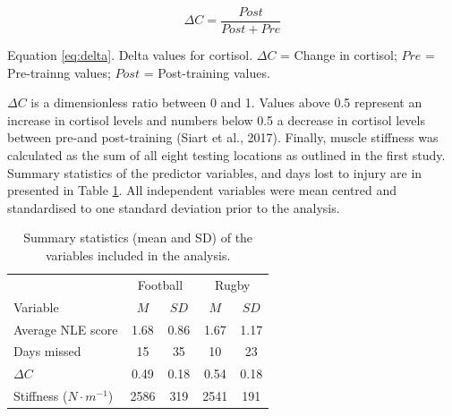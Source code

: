 \documentclass[man,floatsintext]{apa6}
\begin{document}
\begin{equation} 
  \Delta C = \frac{Post}{Post + Pre}
  \label{eq:delta}
\end{equation}

\noindent Equation \eqref{eq:delta}. Delta values for cortisol. \(\Delta C\) = Change in cortisol; \(Pre\) = Pre-trainng values; \(Post\) = Post-training values.

\(\Delta C\) is a dimensionless ratio between 0 and 1. Values above 0.5 represent an increase in cortisol levels and numbers below 0.5 a decrease in cortisol levels between pre-and post-training (Siart et al., 2017).
Finally, muscle stiffness was calculated as the sum of all eight testing locations as outlined in the first study.
Summary statistics of the predictor variables, and days lost to injury are in presented in Table \ref{tab:descriptivevars}.
All independent variables were mean centred and standardised to one standard deviation prior to the analysis.

\begin{table}[H]

\begin{center}
\begin{threeparttable}

\caption{\label{tab:descriptivevars}Summary statistics (mean and SD) of the variables included in the analysis.}

\begin{tabular}{lcccc}
\toprule
 & \multicolumn{2}{c}{Football} & \multicolumn{2}{c}{Rugby} \\
\cmidrule(r){2-3} \cmidrule(r){4-5}
Variable & $M$ & $SD$ & $M$ & $SD$\\
\midrule
Average NLE score & 1.68 & 0.86 & 1.67 & 1.17\\
Days missed & 15 & 35 & 10 & 23\\
$\Delta C$ & 0.49 & 0.18 & 0.54 & 0.18\\
Stiffness ($\si{N \cdot m^{-1}}$) & 2586 & 319 & 2541 & 191\\
\bottomrule
\end{tabular}

\end{threeparttable}
\end{center}

\end{table}
\end{document}

